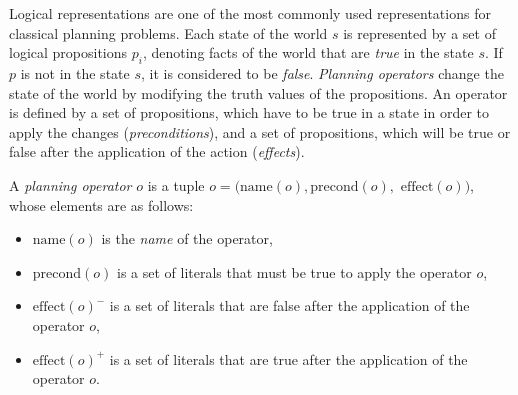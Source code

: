 


\noindent Logical representations are one of the most commonly used representations for classical planning problems. Each state of the world $s$ is represented by a set of logical propositions $p_i$, denoting facts of the world that are \textit{true} in the state $s$. If $p$ is not in the state $s$, it is considered to be \textit{false}.
\textit{Planning operators} change the state of the world by modifying the truth values of the propositions. An operator is defined by a set of propositions, which have to be true in a state in order to apply the changes (\textit{preconditions}), and a set of propositions, which will be true or false after the application of the action (\textit{effects}).

\begin{definition}
A \textit{planning operator} $o$ is a tuple $o = (\text{name}(o), \text{precond}(o),$ $\text{effect}(o))$, whose elements are as follows:
\begin{itemize}
	\item $\text{name}(o)$ is the {\em name} of the operator,
	\item $\text{precond}(o)$ is a set of literals that must be true to apply the operator $o$,
	\item $\text{effect}(o)^{-}$ is a set of literals that are false after the application of the operator $o$,
	\item $\text{effect}(o)^{+}$ is a set of literals that are true after the application of the operator $o$.
\end{itemize}
\end{definition}



